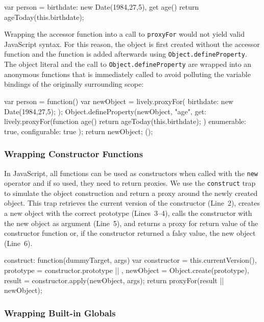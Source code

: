 \documentclass{sigplanconf}
\begin{document}
\begin{code}
var person = {
    birthdate: new Date(1984,27,5),
    get age() {
        return ageToday(this.birthdate);
    }
}
\end{code}

Wrapping the accessor function into a call to \lstinline{proxyFor} would not yield valid JavaScript syntax.
For this reason, the object is first created without the accessor function and the function is added afterwards using \lstinline{Object.defineProperty}.
The object literal and the call to \lstinline{Object.defineProperty} are wrapped into an anonymous functions that is immediately called to avoid polluting the variable bindings of the originally surrounding scope:

\begin{code}
var person = function() {
    var newObject = lively.proxyFor({
        birthdate: new Date(1984,27,5);
    });
    Object.defineProperty(newObject, "age", {
        get: lively.proxyFor(function age() {
            return ageToday(this.birthdate);
        })
        enumerable: true,
        configurable: true
    });
    return newObject;
}();
\end{code}

\subsubsection{Wrapping Constructor Functions} 

In JavaScript, all functions can be used as constructors when called with the \lstinline{new} operator and if so used, they need to return proxies.
We use the \lstinline{construct} trap to simulate the object construction and return a proxy around the newly created object.
This trap retrieves the current version of the constructor (Line~2), creates a new object with the correct prototype (Lines~3--4), calls the constructor with the new object as argument (Line~5), and returns a proxy for return value of the constructor function or, if the constructor returned a falsy value, the new object (Line~6).
\begin{code}
construct: function(dummyTarget, args) {
    var constructor = this.currentVersion(),
        prototype = constructor.prototype || {},
        newObject = Object.create(prototype),
        result = constructor.apply(newObject, args);
    return proxyFor(result || newObject);
}
\end{code}

\subsubsection{Wrapping Built-in Globals}
\end{document}
